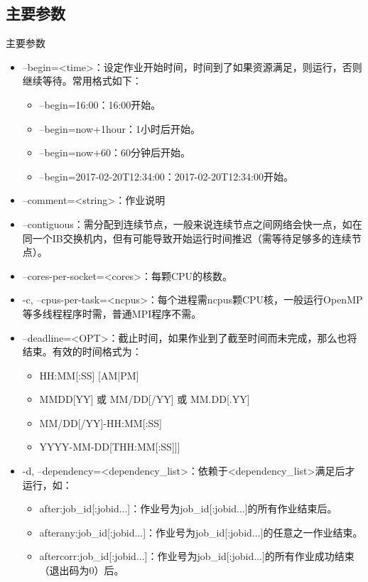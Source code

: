 \subsection{主要参数}
\begin{frame}{主要参数}
\begin{itemize}
\item --begin=<time>：设定作业开始时间，时间到了如果资源满足，则运行，否则继续等待。常用格式如下：
\begin{itemize}
	\item --begin=16:00：16:00开始。
    \item --begin=now+1hour：1小时后开始。
    \item --begin=now+60：60分钟后开始。
    \item --begin=2017-02-20T12:34:00：2017-02-20T12:34:00开始。
\end{itemize}
\item --comment=<string>：作业说明
\item --contiguous：需分配到连续节点，一般来说连续节点之间网络会快一点，如在同一个IB交换机内，但有可能导致开始运行时间推迟（需等待足够多的连续节点）。
\item --cores-per-socket=<cores>：每颗CPU的核数。
\item -c, --cpus-per-task=<ncpus>：每个进程需ncpus颗CPU核，一般运行OpenMP等多线程程序时需，普通MPI程序不需。
\item --deadline=<OPT>：截止时间，如果作业到了截至时间而未完成，那么也将结束。有效的时间格式为：
\begin{itemize}
	\item HH:MM[:SS] [AM|PM]
    \item MMDD[YY] 或 MM/DD[/YY] 或 MM.DD[.YY]
    \item MM/DD[/YY]-HH:MM[:SS]
    \item YYYY-MM-DD[THH:MM[:SS]]]
\end{itemize}
\item -d, --dependency=<dependency\_list>：依赖于<dependency\_list>满足后才运行，如：
\begin{itemize}
	\item after:job\_id[:jobid...]：作业号为job\_id[:jobid...]的所有作业结束后。
    \item afterany:job\_id[:jobid...]：作业号为job\_id[:jobid...]的任意之一作业结束。
    \item aftercorr:job\_id[:jobid...]：作业号为job\_id[:jobid...]的所有作业成功结束（退出码为0）后。

\end{itemize}
\end{itemize}
\end{frame}
